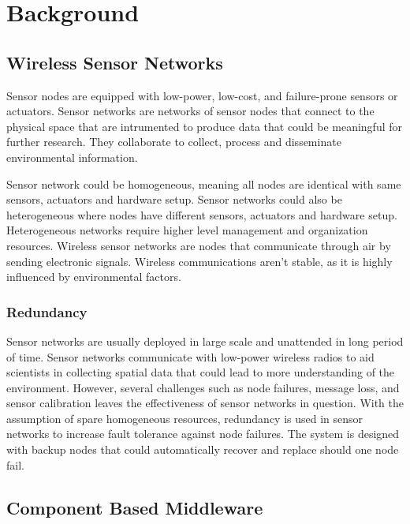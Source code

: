 \cleardoublepage
\singlespacing
\chapter{Background}
\label{c:background}
\doublespacing\nointerlineskip

\section{Wireless Sensor Networks}

Sensor nodes are equipped with low-power, low-cost, and failure-prone
sensors or actuators. Sensor networks are networks of sensor nodes that connect to the
physical space that are intrumented to produce data that could be meaningful
for further research. They collaborate to collect, process and disseminate
environmental information\cite{ArchanaBharathidasan}.

Sensor network could be homogeneous, meaning all nodes are identical with same
sensors, actuators and hardware setup. Sensor networks could also be
heterogeneous where nodes have different sensors, actuators and hardware setup.
Heterogeneous networks require higher level management and organization
resources. Wireless sensor networks are nodes that communicate through air by
sending electronic signals. Wireless communications aren't stable, as it is
highly influenced by environmental factors.

\subsection{Redundancy}

Sensor networks are usually deployed in large scale and unattended in long
period of time. Sensor networks communicate with
low-power wireless radios to aid scientists in collecting spatial data that
could lead to more understanding of the environment. However, several
challenges such as node failures, message loss, and sensor calibration leaves
the effectiveness of sensor networks in question. With the assumption of spare
homogeneous resources, redundancy is used in sensor networks to increase fault
tolerance against node failures. The system is designed with backup nodes that
could automatically recover and replace should one node fail.

\section{Component Based Middleware}

